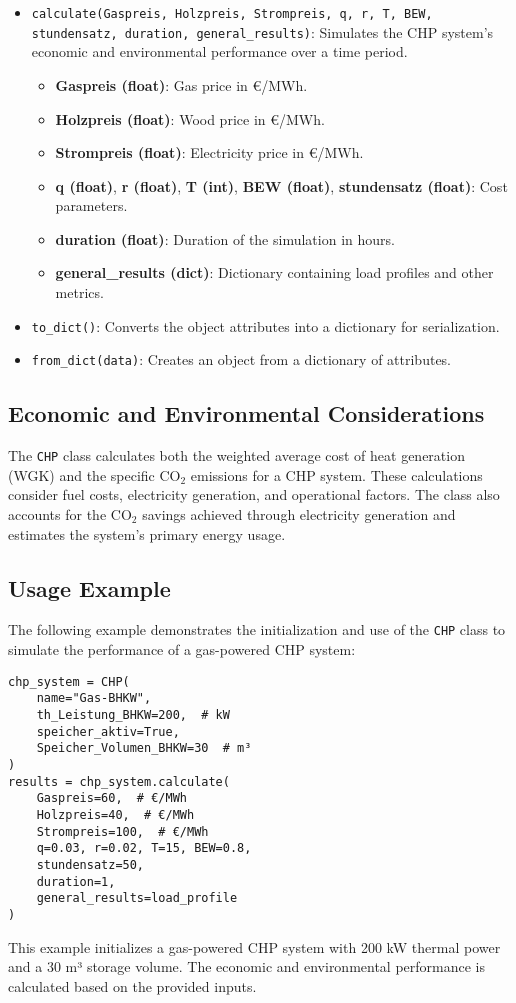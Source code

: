 \begin{itemize}
    \item \texttt{calculate(Gaspreis, Holzpreis, Strompreis, q, r, T, BEW, stundensatz, duration, general\_results)}: 
    Simulates the CHP system's economic and environmental performance over a time period.
    \begin{itemize}
        \item \textbf{Gaspreis (float)}: Gas price in €/MWh.
        \item \textbf{Holzpreis (float)}: Wood price in €/MWh.
        \item \textbf{Strompreis (float)}: Electricity price in €/MWh.
        \item \textbf{q (float)}, \textbf{r (float)}, \textbf{T (int)}, \textbf{BEW (float)}, \textbf{stundensatz (float)}: Cost parameters.
        \item \textbf{duration (float)}: Duration of the simulation in hours.
        \item \textbf{general\_results (dict)}: Dictionary containing load profiles and other metrics.
    \end{itemize}

    \item \texttt{to\_dict()}: Converts the object attributes into a dictionary for serialization.
    
    \item \texttt{from\_dict(data)}: Creates an object from a dictionary of attributes.
\end{itemize}

\subsection{Economic and Environmental Considerations}
The \texttt{CHP} class calculates both the weighted average cost of heat generation (WGK) and the specific CO$_2$ emissions for a CHP system. These calculations consider fuel costs, electricity generation, and operational factors. The class also accounts for the CO$_2$ savings achieved through electricity generation and estimates the system's primary energy usage.

\subsection{Usage Example}
The following example demonstrates the initialization and use of the \texttt{CHP} class to simulate the performance of a gas-powered CHP system:

\begin{verbatim}
chp_system = CHP(
    name="Gas-BHKW", 
    th_Leistung_BHKW=200,  # kW
    speicher_aktiv=True,
    Speicher_Volumen_BHKW=30  # m³
)
results = chp_system.calculate(
    Gaspreis=60,  # €/MWh
    Holzpreis=40,  # €/MWh
    Strompreis=100,  # €/MWh
    q=0.03, r=0.02, T=15, BEW=0.8, 
    stundensatz=50, 
    duration=1, 
    general_results=load_profile
)
\end{verbatim}
This example initializes a gas-powered CHP system with 200 kW thermal power and a 30 m³ storage volume. The economic and environmental performance is calculated based on the provided inputs.
